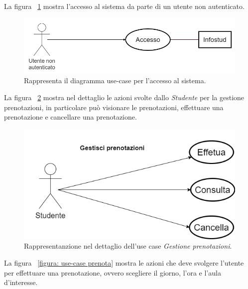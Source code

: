 La figura ~\ref{figura: accesso} mostra l’accesso al sistema da parte di un utente non autenticato.\\
\begin{figure}[H]
\begin{center}
  \includegraphics[width=1 \textwidth]{Figure/use-case accesso.png}
    \caption{Rappresenta il diagramma use-case per l’accesso al sistema.}\label{figura: accesso}
\end{center}
\end{figure}


La figura ~\ref{figura: use-case prenotazioni} mostra nel dettaglio le azioni svolte dallo \textit{Studente} per la gestione prenotazioni, in particolare può visionare le prenotazioni, effettuare una prenotazione e cancellare una prenotazione.\\
 
\begin{figure}[H]
\begin{center}
  \includegraphics[width=1 \textwidth]{Figure/use-case gestisci prenotaizoni.png}
    \caption{Rappresentanzione nel dettaglio dell’use case \textit{Gestione prenotazioni}.}\label{figura: use-case prenotazioni}
\end{center}
\end{figure}

La figura ~\ref{figura: use-case prenota} mostra le azioni che deve svolgere l’utente per effettuare una prenotazione, ovvero scegliere il giorno, l’ora e l’aula d’interesse.\\

